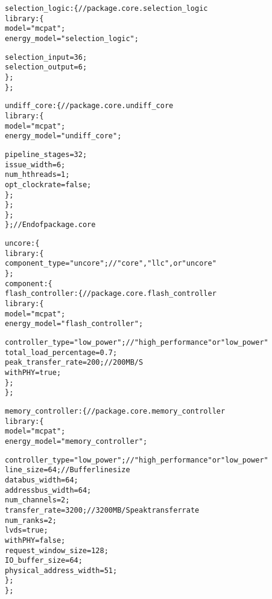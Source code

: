 {\begin{alltt}
                    selection\_logic: \{ // package.core.selection\_logic
                        library: \{
                            model = "mcpat";
                            energy_model = "selection_logic";
                            
                            selection_input = 36;
                            selection_output = 6;
                        \};
                    \};
                    
                    undiff\_core: \{ // package.core.undiff\_core
                        library: \{
                            model = "mcpat";
                            energy_model = "undiff_core";
                            
                            pipeline_stages = 32;
                            issue_width = 6;
                            num_hthreads = 1;
                            opt_clockrate = false;
                        \};
                    \};
                \};
            \}; // End of package.core
            
            uncore: \{
                library: \{
                    component_type = "uncore"; // "core", "llc", or "uncore"
                \};
                component: \{
                    flash\_controller: \{ // package.core.flash\_controller
                        library: \{
                            model = "mcpat";
                            energy_model = "flash_controller";
                            
                            controller_type = "low_power"; // "high_performance" or "low_power"
                            total_load_percentage = 0.7;
                            peak_transfer_rate = 200; // 200MB/S
                            withPHY = true;
                        \};
                    \};
                    
                    memory\_controller: \{ // package.core.memory\_controller
                        library: \{
                            model = "mcpat";
                            energy_model = "memory_controller";
                            
                            controller_type = "low_power"; // "high_performance" or "low_power"
                            line_size = 64; // Buffer line size
                            databus_width = 64;
                            addressbus_width = 64;
                            num_channels = 2;
                            transfer_rate = 3200; // 3200MB/S peak transfer rate
                            num_ranks = 2;
                            lvds = true;
                            withPHY = false;
                            request_window_size = 128;
                            IO_buffer_size = 64;
                            physical_address_width = 51;
                        \};
                    \};
                    

\end{alltt}}
